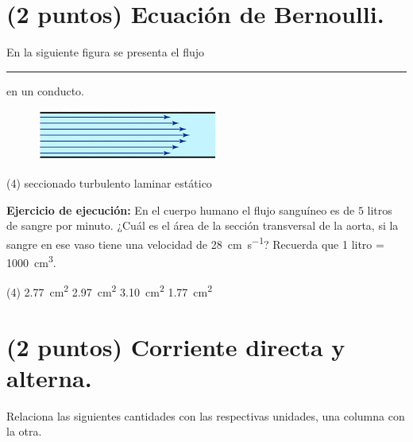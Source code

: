 \documentclass[12pt, letter]{exam}
\begin{document}
\begin{questions}
    \section{(2 puntos) Ecuación de Bernoulli.}

    \question En la siguiente figura se presenta el flujo \rule{2cm}{0.1mm} en un conducto.
    \begin{figure}[H]
        \centering
        \includegraphics[scale=0.8]{Imagenes/Flujo_02_Laminar.png}
    \end{figure}
    \begin{tasks}(4)
        \task seccionado
        \task turbulento
        \task laminar
        \task estático
    \end{tasks}
    \question \label{Ejercicio_09} \label{Problema_01} \textbf{Ejercicio de ejecución: } En el cuerpo humano el flujo sanguíneo es de $5$ litros de sangre por minuto. ¿Cuál es el área de la sección transversal de la aorta, si la sangre en ese vaso tiene una velocidad de \SI{28}{\centi\meter\per\second}? Recuerda que 1 litro = \SI{1000}{\cubic\centi\meter}.
    \begin{tasks}(4)
        \task \SI{2.77}{\square\centi\meter}
        \task \SI{2.97}{\square\centi\meter}
        \task \SI{3.10}{\square\centi\meter}
        \task \SI{1.77}{\square\centi\meter}
    \end{tasks}

    \section{(2 puntos) Corriente directa y alterna.}

    \question Relaciona las siguientes cantidades con las respectivas unidades, una columna con la otra.
    

\end{questions}
\end{document}
